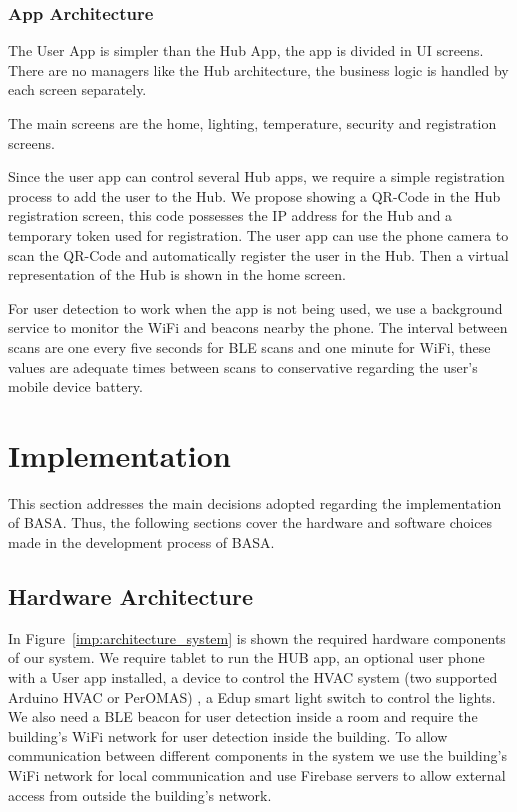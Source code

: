 \documentclass[conference]{IEEEtran}
\begin{document}
\subsubsection{App Architecture}
The User App is simpler than the Hub App, the app is divided in \ac{UI} screens. There are no managers like the Hub architecture, the business logic is handled by each screen separately. 

The main screens are the home, lighting, temperature, security and registration screens.

Since the user app can control several Hub apps, we require a simple registration process to add the user to the Hub. We propose showing a QR-Code in the Hub registration screen, this code possesses the \ac{IP} address for the Hub and a temporary token used for registration. The user app can use the phone camera to scan the QR-Code and automatically register the user in the Hub. Then a virtual representation of the Hub is shown in the home screen.

For user detection to work when the app is not being used, we use a background service to monitor the \ac{WiFi} and beacons nearby the phone. The interval between scans are one every five seconds for \ac{BLE} scans and one minute for WiFi, these values are adequate times between scans to conservative regarding the user's mobile device battery.



\section{Implementation}

This section addresses the main decisions adopted regarding the implementation of BASA.
Thus, the following sections cover the hardware and software choices made in the development process of BASA.

\subsection{Hardware Architecture}\label{hardware_arch_imp}

In Figure~\ref{imp:architecture_system} is shown the required hardware components of our system. We require tablet to run the HUB app, an optional user phone with a User app installed, a device to control the HVAC system (two supported Arduino HVAC or PerOMAS) , a Edup smart light switch to control the lights. We also need a \ac{BLE} beacon for user detection inside a room and require the building's \ac{WiFi} network for user detection inside the building.
To allow communication between different components in the system we use the building's \ac{WiFi} network for local communication and use Firebase servers to allow external access from outside the building's network.
\end{document}
